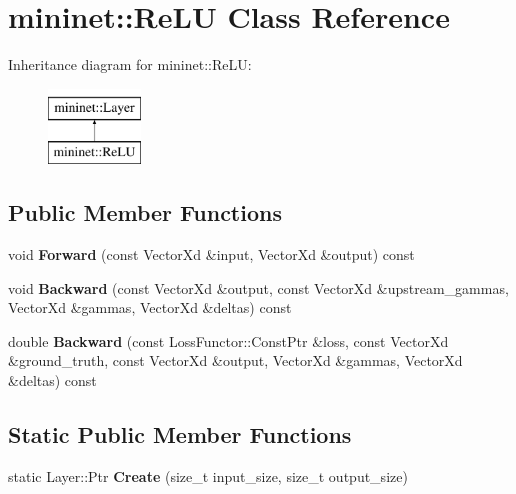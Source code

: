 \hypertarget{classmininet_1_1_re_l_u}{}\section{mininet\+:\+:Re\+LU Class Reference}
\label{classmininet_1_1_re_l_u}
Inheritance diagram for mininet\+:\+:Re\+LU\+:\begin{figure}[H]
\begin{center}
\leavevmode
\includegraphics[height=2.000000cm]{classmininet_1_1_re_l_u}
\end{center}
\end{figure}
\subsection*{Public Member Functions}
\begin{DoxyCompactItemize}
\item 
\hypertarget{classmininet_1_1_re_l_u_a735805e56b2d230e1b48ac0e02487c40}{}\label{classmininet_1_1_re_l_u_a735805e56b2d230e1b48ac0e02487c40} 
void {\bfseries Forward} (const Vector\+Xd \&input, Vector\+Xd \&output) const
\item 
\hypertarget{classmininet_1_1_re_l_u_a01bb8ec3b01d9f8dfb175c62490f109e}{}\label{classmininet_1_1_re_l_u_a01bb8ec3b01d9f8dfb175c62490f109e} 
void {\bfseries Backward} (const Vector\+Xd \&output, const Vector\+Xd \&upstream\+\_\+gammas, Vector\+Xd \&gammas, Vector\+Xd \&deltas) const
\item 
\hypertarget{classmininet_1_1_re_l_u_ad7ce7471c4a9fea71e2f4e68051f939d}{}\label{classmininet_1_1_re_l_u_ad7ce7471c4a9fea71e2f4e68051f939d} 
double {\bfseries Backward} (const Loss\+Functor\+::\+Const\+Ptr \&loss, const Vector\+Xd \&ground\+\_\+truth, const Vector\+Xd \&output, Vector\+Xd \&gammas, Vector\+Xd \&deltas) const
\end{DoxyCompactItemize}
\subsection*{Static Public Member Functions}
\begin{DoxyCompactItemize}
\item 
\hypertarget{classmininet_1_1_re_l_u_a1d9e8079466ab4a85bb01894877045a6}{}\label{classmininet_1_1_re_l_u_a1d9e8079466ab4a85bb01894877045a6} 
static Layer\+::\+Ptr {\bfseries Create} (size\+\_\+t input\+\_\+size, size\+\_\+t output\+\_\+size)
\end{DoxyCompactItemize}
